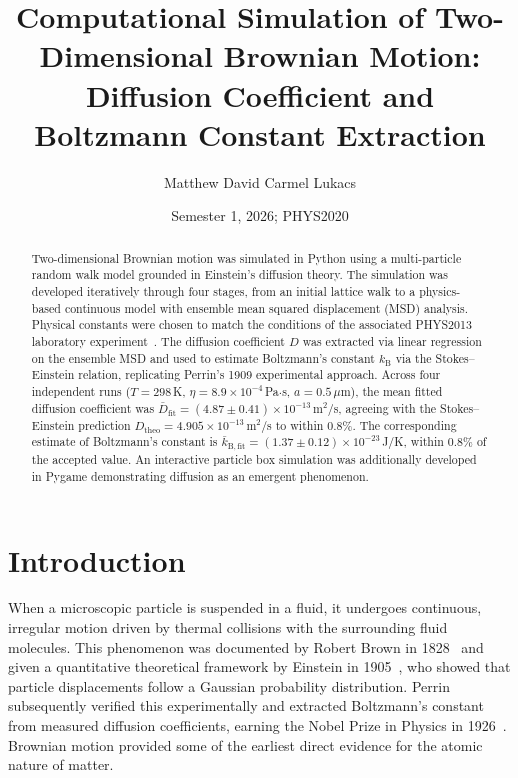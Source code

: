 \documentclass[prb,twocolumn]{revtex4-1}
\begin{document}
\title{Computational Simulation of Two-Dimensional Brownian Motion:\\
Diffusion Coefficient and Boltzmann Constant Extraction}

\author{Matthew David Carmel Lukacs}
\date{Semester 1, 2026; PHYS2020}

\begin{abstract}
Two-dimensional Brownian motion was simulated in Python using a multi-particle random walk model grounded in Einstein's diffusion theory. The simulation was developed iteratively through four stages, from an initial lattice walk to a physics-based continuous model with ensemble mean squared displacement (MSD) analysis. Physical constants were chosen to match the conditions of the associated PHYS2013 laboratory experiment~\cite{lukacs2026lab}. The diffusion coefficient $D$ was extracted via linear regression on the ensemble MSD and used to estimate Boltzmann's constant $k_{\mathrm{B}}$ via the Stokes--Einstein relation, replicating Perrin's 1909 experimental approach. Across four independent runs ($T = 298$\,K, $\eta = 8.9\times10^{-4}$\,Pa$\cdot$s, $a = 0.5\,\mu$m), the mean fitted diffusion coefficient was $\bar{D}_{\mathrm{fit}} = (4.87\pm0.41)\times10^{-13}$\,m$^2$/s, agreeing with the Stokes--Einstein prediction $D_{\mathrm{theo}} = 4.905\times10^{-13}$\,m$^2$/s to within $0.8\%$. The corresponding estimate of Boltzmann's constant is $\bar{k}_{\mathrm{B,fit}} = (1.37\pm0.12)\times10^{-23}$\,J/K, within $0.8\%$ of the accepted value. An interactive particle box simulation was additionally developed in Pygame demonstrating diffusion as an emergent phenomenon.
\end{abstract}

\maketitle

\section{Introduction}

When a microscopic particle is suspended in a fluid, it undergoes continuous, irregular motion driven by thermal collisions with the surrounding fluid molecules. This phenomenon was documented by Robert Brown in 1828~\cite{brown1828} and given a quantitative theoretical framework by Einstein in 1905~\cite{einstein1905}, who showed that particle displacements follow a Gaussian probability distribution. Perrin subsequently verified this experimentally and extracted Boltzmann's constant from measured diffusion coefficients, earning the Nobel Prize in Physics in 1926~\cite{perrin1909}. Brownian motion provided some of the earliest direct evidence for the atomic nature of matter.
\end{document}
